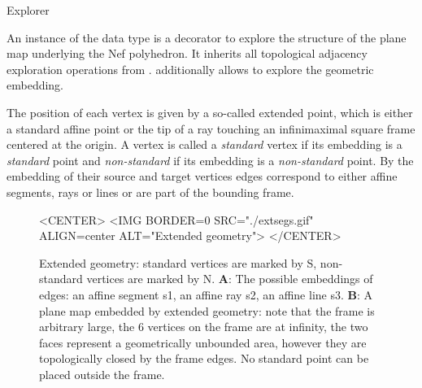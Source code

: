
\begin{ccRefClass}{Explorer}

\ccDefinition

An instance  of the data type  is a decorator to
explore the structure of the plane map underlying the Nef
polyhedron. It inherits all topological adjacency exploration
operations from .  additionally
allows to explore the geometric embedding.

The position of each vertex is given by a so-called extended point,
which is either a standard affine point or the tip of a ray touching
an infinimaximal square frame centered at the origin. A vertex 
is called a \emph{standard} vertex if its embedding is a
\emph{standard} point and \emph{non-standard} if its embedding is a
\emph{non-standard} point. By the embedding of their source and target
vertices edges correspond to either affine segments, rays or lines or
are part of the bounding frame.

\begin{figure}[htbp]
\begin{ccTexOnly}
\begin{center}
\end{center}
\end{ccTexOnly}
\caption{Extended geometry: standard vertices are marked
by S, non-standard vertices are marked by N. \textbf{A}: The possible
embeddings of edges: an affine segment s1, an affine ray s2, an affine
line s3. \textbf{B}: A plane map embedded by extended geometry: note
that the frame is arbitrary large, the 6 vertices on the frame are at
infinity, the two faces represent a geometrically unbounded area,
however they are topologically closed by the frame edges. No standard
point can be placed outside the frame.}\label{extsegs}
\begin{ccHtmlOnly}
<CENTER>
<IMG BORDER=0 SRC="./extsegs.gif" ALIGN=center
ALT="Extended geometry">
</CENTER>
\end{ccHtmlOnly}
\end{figure}      


\end{ccRefClass}
